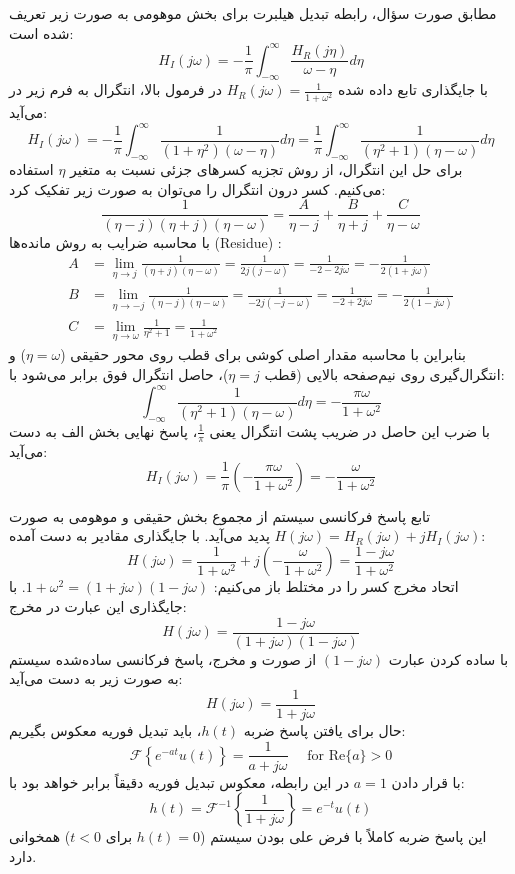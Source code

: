 مطابق صورت سؤال، رابطه تبدیل هیلبرت برای بخش موهومی به صورت زیر تعریف شده است:
\[
H_I(j\omega) = -\frac{1}{\pi} \int_{-\infty}^{\infty} \frac{H_R(j\eta)}{\omega - \eta} d\eta
\]
با جایگذاری تابع داده شده $H_R(j\omega) = \frac{1}{1+\omega^2}$ در فرمول بالا، انتگرال به فرم زیر در می‌آید:
\[
H_I(j\omega) = -\frac{1}{\pi} \int_{-\infty}^{\infty} \frac{1}{(1+\eta^2)(\omega - \eta)} d\eta = \frac{1}{\pi} \int_{-\infty}^{\infty} \frac{1}{(\eta^2+1)(\eta - \omega)} d\eta
\]
برای حل این انتگرال، از روش تجزیه کسرهای جزئی نسبت به متغیر $\eta$ استفاده می‌کنیم. کسر درون انتگرال را می‌توان به صورت زیر تفکیک کرد:
\[
\frac{1}{(\eta - j)(\eta + j)(\eta - \omega)} = \frac{A}{\eta - j} + \frac{B}{\eta + j} + \frac{C}{\eta - \omega}
\]
با محاسبه ضرایب به روش مانده‌ها (Residue) :
\begin{align*}
A &= \lim_{\eta \to j} \frac{1}{(\eta + j)(\eta - \omega)} = \frac{1}{2j(j - \omega)} = \frac{1}{-2 - 2j\omega} = -\frac{1}{2(1+j\omega)} \\
B &= \lim_{\eta \to -j} \frac{1}{(\eta - j)(\eta - \omega)} = \frac{1}{-2j(-j - \omega)} = \frac{1}{-2 + 2j\omega} = -\frac{1}{2(1-j\omega)} \\
C &= \lim_{\eta \to \omega} \frac{1}{\eta^2 + 1} = \frac{1}{1 + \omega^2}
\end{align*}
بنابراین با محاسبه مقدار اصلی کوشی برای قطب روی محور حقیقی ($\eta = \omega$) و انتگرال‌گیری روی نیم‌صفحه بالایی (قطب $\eta = j$)، حاصل انتگرال فوق برابر می‌شود با:
\[
\int_{-\infty}^{\infty} \frac{1}{(\eta^2+1)(\eta - \omega)} d\eta = -\frac{\pi \omega}{1+\omega^2}
\]
با ضرب این حاصل در ضریب پشت انتگرال یعنی $\frac{1}{\pi}$، پاسخ نهایی بخش الف به دست می‌آید:
\[
H_I(j\omega) = \frac{1}{\pi} \left( -\frac{\pi \omega}{1+\omega^2} \right) = -\frac{\omega}{1+\omega^2}
\]

تابع پاسخ فرکانسی سیستم از مجموع بخش حقیقی و موهومی به صورت $H(j\omega) = H_R(j\omega) + j H_I(j\omega)$ پدید می‌آید. با جایگذاری مقادیر به دست آمده:
\[
H(j\omega) = \frac{1}{1+\omega^2} + j \left( -\frac{\omega}{1+\omega^2} \right) = \frac{1 - j\omega}{1+\omega^2}
\]
اتحاد مخرج کسر را در مختلط باز می‌کنیم: $1+\omega^2 = (1+j\omega)(1-j\omega)$. با جایگذاری این عبارت در مخرج:
\[
H(j\omega) = \frac{1 - j\omega}{(1+j\omega)(1-j\omega)}
\]
با ساده کردن عبارت $(1-j\omega)$ از صورت و مخرج، پاسخ فرکانسی ساده‌شده سیستم به صورت زیر به دست می‌آید:
\[
H(j\omega) = \frac{1}{1+j\omega}
\]
حال برای یافتن پاسخ ضربه $h(t)$، باید تبدیل فوریه معکوس بگیریم:
\[
\mathcal{F} \left\{ e^{-at} u(t) \right\} = \frac{1}{a + j\omega} \quad \text{ \ \ \  for } \text{Re}\{a\} > 0
\]
با قرار دادن $a=1$ در این رابطه، معکوس تبدیل فوریه دقیقاً برابر خواهد بود با:
\[
h(t) = \mathcal{F}^{-1} \left\{ \frac{1}{1+j\omega} \right\} = e^{-t} u(t)
\]
این پاسخ ضربه کاملاً با فرض علی بودن سیستم ($h(t) = 0$ برای $t < 0$) همخوانی دارد.

